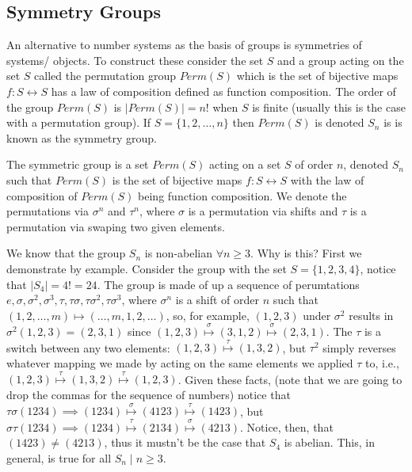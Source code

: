 \documentclass[12pt,oneside]{report}
\begin{document}

\subsection{Symmetry Groups}

An alternative to number systems as the basis of groups is symmetries of systems/ objects. To construct these consider the set \( S \) and a group acting on the set \( S \) called the permutation group \( Perm(S) \) which is the set of bijective maps \( f: S \leftrightarrow S \) has a law of composition defined as function composition. The order of the group \( Perm(S) \) is \( |Perm(S)| =n! \) when \( S \) is finite (usually this is the case with a permutation group). If \( S = \{ 1,2,\ldots ,n \} \) then \( Perm(S) \) is denoted \( S_n \) is is known as the symmetry group.

\begin{definition}
  The symmetric group is a set \( Perm(S) \) acting on a set \( S \) of order \( n \), denoted \( S_n \) such that \( Perm(S) \) is the set of bijective maps \( f: S \leftrightarrow S \) with the law of composition of \( Perm(S) \) being function composition. We denote the permutations via \( \sigma^n  \) and \( \tau ^n \), where \( \sigma  \) is a permutation via shifts and \( \tau  \) is a permutation via swaping two given elements. 
\end{definition}


\begin{problem}[1.1.1]
  We know that the group \( S_n \) is non-abelian \( \forall n\ge 3 \). Why is this? First we demonstrate by example. Consider the group with the set \( S =\{1,2,3,4\}\), notice that \( |S_4| =4! =24 \). The group is made of up a sequence of perumtations \( e,\sigma ,\sigma^2,\sigma^3,\tau ,\tau \sigma ,\tau \sigma^2,\tau \sigma^3 \), where \( \sigma ^n \) is a shift of order \( n \) such that \( (1,2,\ldots,m )\mapsto (\ldots ,m,1,2,\ldots ) \), so, for example, \( (1,2,3)\) under \( \sigma^2 \) results in \(\sigma^2(1,2,3)=(2,3,1)\) since \( (1,2,3)\overset{\sigma}{\mapsto} (3,1,2) \overset{\sigma}{\mapsto} (2,3,1) \). The \( \tau  \) is a switch between any two elements: \( (1,2,3)\overset{\tau}{\mapsto}(1,3,2) \), but \( \tau ^2 \) simply reverses whatever mapping we made by acting on the same elements we applied \( \tau  \) to, i.e., \( (1,2,3)\overset{\tau}{\mapsto}(1,3,2)\overset{\tau }{\mapsto}(1,2,3) \). Given these facts, (note that we are going to drop the commas for the sequence of numbers) notice that \( \tau \sigma (1234) \implies (1234)\overset{\sigma}{\mapsto} (4123) \overset{\tau }{\mapsto} (1423)\), but \( \sigma \tau (1234)\implies (1234)\overset{\tau }{\mapsto} (2134) \overset{\sigma  }{\mapsto} (4213) \). Notice, then, that \( (1423)\neq (4213) \), thus it mustn't be the case that \( S_4 \) is abelian. This, in general, is true for all \( S_n \mid n\ge 3 \). 
\end{problem}
\end{document}
